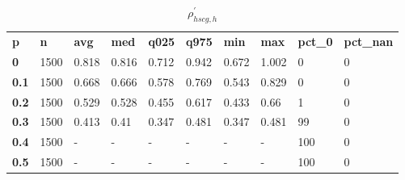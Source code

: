 \begin{table}[h]
 \centering 
\footnotesize
\caption{$\rho_{hscg,h}^\prime $}
\label{tab:alphahscgh}
\begin{tabular}[h]{| l l l l l l l l l l|
    } \hline
\textbf{ p} & \textbf{ n} & \textbf{ avg} & \textbf{ med} & \textbf{ q025} & \textbf{ q975} & \textbf{ min} & \textbf{ max} & \textbf{ pct\_0} & \textbf{ pct\_nan}
           \\
  \textbf{  0} & 1500 & 0.818 & 0.816 & 0.712 & 0.942 & 0.672 & 1.002 &   0 & 0
           \\
  \textbf{0.1} & 1500 & 0.668 & 0.666 & 0.578 & 0.769 & 0.543 & 0.829 &   0 & 0
           \\
  \textbf{0.2} & 1500 & 0.529 & 0.528 & 0.455 & 0.617 & 0.433 &  0.66 &   1 & 0
           \\
  \textbf{0.3} & 1500 & 0.413 &  0.41 & 0.347 & 0.481 & 0.347 & 0.481 &  99 & 0
           \\
  \textbf{0.4} & 1500 & - & - & - & - & - & - & 100 & 0
           \\
  \textbf{0.5} & 1500 & - & - & - & - & - & - & 100 & 0
           \\
 \hline \end{tabular}
 \end{table}
